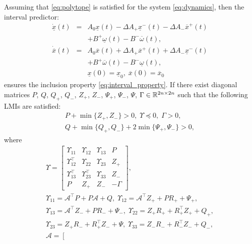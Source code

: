 \documentclass{article}
\begin{document}
\begin{theorem}
\label{thm:predictor}
Assuming that \eqref{eq:polytope} is satisfied for the system \eqref{eq:dynamics}, then the interval predictor:
\begin{eqnarray}
\dot{\underline{x}}(t) & = & A_{0}\underline{x}(t)-\Delta A_{+}\underline{x}^{-}(t)-\Delta A_{-}\overline{x}^{+}(t)\nonumber \\
 &  & +B^{+}\underline{\omega}(t)-B^{-}\overline{\omega}(t),\nonumber\\
\dot{\overline{x}}(t) & = & A_{0}\overline{x}(t)+\Delta A_{+}\overline{x}^{+}(t)+\Delta A_{-}\underline{x}^{-}(t) \label{eq:interval_predictor} \\
 &  & +B^{+}\overline{\omega}(t)-B^{-}\underline{\omega}(t),\nonumber \\
 &  & \underline{x}(0)=\underline{x}_{0},\;\overline{x}(0)=\overline{x}_{0}\nonumber 
\end{eqnarray}
ensures the inclusion property \eqref{eq:interval_property}. If there exist diagonal matrices $P$, $Q$, $Q_{+}$, $Q_{-}$, $Z_{+}$, $Z_{-}$, $\Psi_{+}$, $\Psi_{-}$, $\Psi$, $\Gamma\in\mathbb{R}^{2n\times 2n}$ such that the following LMIs are satisfied:
\begin{gather*}
P+\min\{Z_{+},Z_{-}\}>0,\;\Upsilon\preceq0,\;\Gamma>0,\\
Q+\min\{Q_{+},Q_{-}\}+2\min\{\Psi_{+},\Psi_{-}\}>0,
\end{gather*}
where{\footnotesize{}
\begin{gather*}
\Upsilon=\left[\begin{array}{cccc}
\Upsilon_{11} & \Upsilon_{12} & \Upsilon_{13} & P\\
\Upsilon_{12}^{\top} & \Upsilon_{22} & \Upsilon_{23} & Z_{+}\\
\Upsilon_{13}^{\top} & \Upsilon_{23}^{\top} & \Upsilon_{33} & Z_{-}\\
P & Z_{+} & Z_{-} & -\Gamma
\end{array}\right],\\
\Upsilon_{11}=\mathcal{A}^{\top}P+P\mathcal{A}+Q,\;\Upsilon_{12}=\mathcal{A}^{\top}Z_{+}+PR_{+}+\Psi_{+},\\
\Upsilon_{13}=\mathcal{A}^{\top}Z_{-}+PR_{-}+\Psi_{-},\;\Upsilon_{22}=Z_{+}R_{+}+R_{+}^{\top}Z_{+}+Q_{+},\\
\Upsilon_{23}=Z_{+}R_{-}+R_{+}^{\top}Z_{-}+\Psi,\;\Upsilon_{33}=Z_{-}R_{-}+R_{-}^{\top}Z_{-}+Q_{-},\\
\mathcal{A}=\left[\begin{array}{cc}

\end{array}
\end{gather*}}
\end{theorem}
\end{document}
